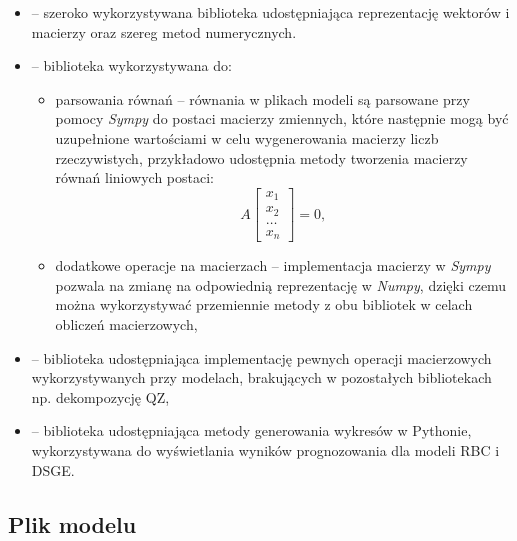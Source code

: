 \begin{itemize}
    \item {} -- szeroko wykorzystywana biblioteka udostępniająca reprezentację wektorów i macierzy oraz szereg metod numerycznych.
    \item {} -- biblioteka wykorzystywana do:
        \begin{itemize}
            \item parsowania równań -- równania w plikach modeli są parsowane przy pomocy \emph{Sympy} do postaci macierzy zmiennych, które następnie mogą być uzupełnione wartościami w celu wygenerowania macierzy liczb rzeczywistych, przykładowo udostępnia metody tworzenia macierzy równań liniowych postaci:
            \begin{equation}
                A \begin{bmatrix}
                    x_1 \\
                    x_2 \\
                    \dots \\
                    x_n
                \end{bmatrix} = 0,
            \end{equation}
            \item dodatkowe operacje na macierzach -- implementacja macierzy w \emph{Sympy} pozwala na zmianę na odpowiednią reprezentację w \emph{Numpy}, dzięki czemu można wykorzystywać przemiennie metody z obu bibliotek w celach obliczeń macierzowych,
        \end{itemize}
    \item {} -- biblioteka udostępniająca implementację pewnych operacji macierzowych wykorzystywanych przy modelach, brakujących w pozostałych bibliotekach np. dekompozycję QZ,
    \item {} -- biblioteka udostępniająca metody generowania wykresów w Pythonie, wykorzystywana do wyświetlania wyników prognozowania dla modeli RBC i DSGE.
\end{itemize}

\subsection{Plik modelu}


